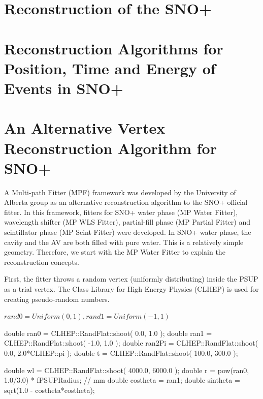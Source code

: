 


\section{Reconstruction of the SNO+}

\section{Reconstruction Algorithms for Position, Time and Energy of Events in SNO+}


\section{An Alternative Vertex Reconstruction Algorithm for SNO+}
A Multi-path Fitter (MPF) framework was developed by the University of Alberta group as an alternative reconstruction algorithm to the SNO+ official fitter. In this framework, fitters for SNO+ water phase (MP Water Fitter), wavelength shifter (MP WLS Fitter), partial-fill phase (MP Partial Fitter) and scintillator phase (MP Scint Fitter) were developed. In SNO+ water phase, the cavity and the AV are both filled with pure water. This is a relatively simple geometry. Therefore, we start with the MP Water Fitter to explain the reconstruction concepts.



First, the fitter throws a random vertex (uniformly distributing) inside the PSUP as a trial vertex. The Class Library for High Energy Physics (CLHEP) is used for creating pseudo-random numbers.

$rand0 = Uniform(0,1), rand1 = Uniform(-1,1)$  


double ran0 = CLHEP::RandFlat::shoot( 0.0, 1.0 );
double ran1 = CLHEP::RandFlat::shoot( -1.0, 1.0 );
double ran2Pi = CLHEP::RandFlat::shoot( 0.0, 2.0*CLHEP::pi );
double t = CLHEP::RandFlat::shoot( 100.0, 300.0 );

double wl = CLHEP::RandFlat::shoot( 4000.0, 6000.0 );
double r = pow(ran0, 1.0/3.0) * fPSUPRadius; // mm
double costheta = ran1;
double sintheta = sqrt(1.0 - costheta*costheta);


